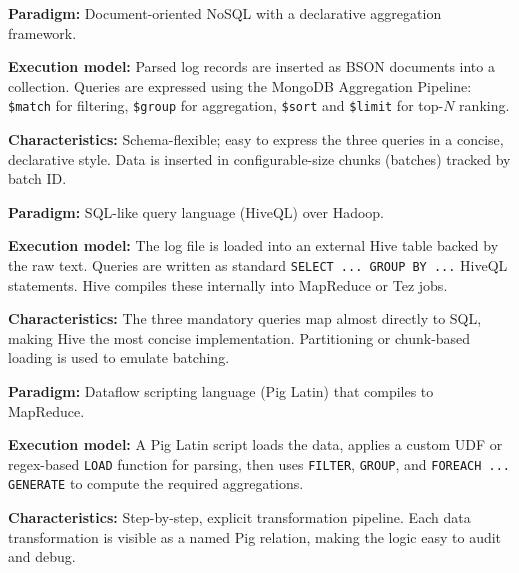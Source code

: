 \documentclass[11pt,a4paper]{article}
\begin{document}
\vspace{5pt}

\begin{mongobox}
\textbf{Paradigm:} Document-oriented NoSQL with a declarative aggregation framework.

\textbf{Execution model:} Parsed log records are inserted as BSON documents into a collection. Queries are expressed using the MongoDB Aggregation Pipeline: \texttt{\$match} for filtering, \texttt{\$group} for aggregation, \texttt{\$sort} and \texttt{\$limit} for top-$N$ ranking.

\textbf{Characteristics:} Schema-flexible; easy to express the three queries in a concise, declarative style. Data is inserted in configurable-size chunks (batches) tracked by batch ID.
\end{mongobox}

\vspace{5pt}

\begin{hivebox}
\textbf{Paradigm:} SQL-like query language (HiveQL) over Hadoop.

\textbf{Execution model:} The log file is loaded into an external Hive table backed by the raw text. Queries are written as standard \texttt{SELECT ... GROUP BY ...} HiveQL statements. Hive compiles these internally into MapReduce or Tez jobs.

\textbf{Characteristics:} The three mandatory queries map almost directly to SQL, making Hive the most concise implementation. Partitioning or chunk-based loading is used to emulate batching.
\end{hivebox}

\vspace{5pt}

\begin{pigbox}
\textbf{Paradigm:} Dataflow scripting language (Pig Latin) that compiles to MapReduce.

\textbf{Execution model:} A Pig Latin script loads the data, applies a custom UDF or regex-based \texttt{LOAD} function for parsing, then uses \texttt{FILTER}, \texttt{GROUP}, and \texttt{FOREACH ... GENERATE} to compute the required aggregations.

\textbf{Characteristics:} Step-by-step, explicit transformation pipeline. Each data transformation is visible as a named Pig relation, making the logic easy to audit and debug.
\end{pigbox}

\end{document}
